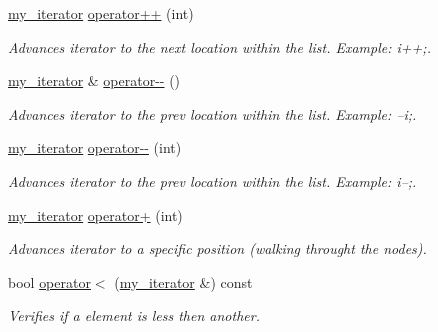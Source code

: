 \begin{DoxyCompactItemize}
\hyperlink{classls_1_1my__iterator}{my\+\_\+iterator} \hyperlink{classls_1_1my__iterator_a87cd11c26f7cff8fb68631d100354143}{operator++} (int)
\begin{DoxyCompactList}\small\item\em Advances iterator to the next location within the list. Example\+: i++;. \end{DoxyCompactList}\item 
\mbox{\label{classls_1_1my__iterator_a27cc5599241072286f87eb3a05275dce}} 
\hyperlink{classls_1_1my__iterator}{my\+\_\+iterator} \& \hyperlink{classls_1_1my__iterator_a27cc5599241072286f87eb3a05275dce}{operator-\/-\/} ()
\begin{DoxyCompactList}\small\item\em Advances iterator to the prev location within the list. Example\+: --i;. \end{DoxyCompactList}\item 
\mbox{\label{classls_1_1my__iterator_a4e31b9ed0b69c94db7027415c1ad5192}} 
\hyperlink{classls_1_1my__iterator}{my\+\_\+iterator} \hyperlink{classls_1_1my__iterator_a4e31b9ed0b69c94db7027415c1ad5192}{operator-\/-\/} (int)
\begin{DoxyCompactList}\small\item\em Advances iterator to the prev location within the list. Example\+: i--;. \end{DoxyCompactList}\item 
\mbox{\label{classls_1_1my__iterator_a77ccb3303f10b6930457fd090c4f2187}} 
\hyperlink{classls_1_1my__iterator}{my\+\_\+iterator} \hyperlink{classls_1_1my__iterator_a77ccb3303f10b6930457fd090c4f2187}{operator+} (int)
\begin{DoxyCompactList}\small\item\em Advances iterator to a specific position (walking throught the nodes). \end{DoxyCompactList}\item 
\mbox{\label{classls_1_1my__iterator_af87392d8c1ad98e669827f622771053a}} 
bool \hyperlink{classls_1_1my__iterator_af87392d8c1ad98e669827f622771053a}{operator$<$} (\hyperlink{classls_1_1my__iterator}{my\+\_\+iterator} \&) const
\begin{DoxyCompactList}\small\item\em Verifies if a element is less then another. \end{DoxyCompactList}\item 

\end{DoxyCompactItemize}

